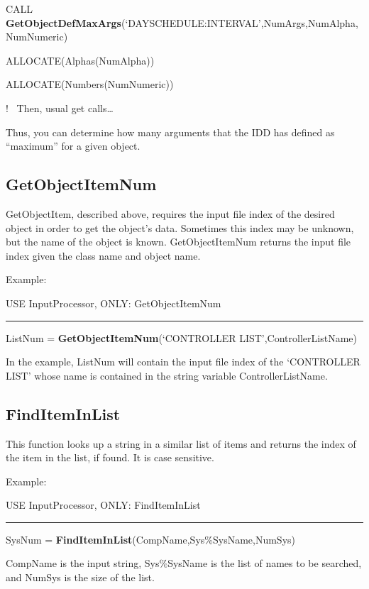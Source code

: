 CALL \textbf{GetObjectDefMaxArgs}(`DAYSCHEDULE:INTERVAL',NumArgs,NumAlpha,NumNumeric)

ALLOCATE(Alphas(NumAlpha))

ALLOCATE(Numbers(NumNumeric))

!~ Then, usual get calls\ldots{}

Thus, you can determine how many arguments that the IDD has defined as ``maximum'' for a given object.

\subsection{GetObjectItemNum}\label{getobjectitemnum}

GetObjectItem, described above, requires the input file index of the desired object in order to get the object's data. Sometimes this index may be unknown, but the name of the object is known. GetObjectItemNum returns the input file index given the class name and object name.

Example:

USE InputProcessor, ONLY: GetObjectItemNum

\begin{center}\rule{0.5\linewidth}{\linethickness}\end{center}

ListNum = \textbf{GetObjectItemNum}(`CONTROLLER LIST',ControllerListName)

In the example, ListNum will contain the input file index of the `CONTROLLER LIST' whose name is contained in the string variable ControllerListName.

\subsection{FindItemInList}\label{finditeminlist}

This function looks up a string in a similar list of items and returns the index of the item in the list, if found. It is case sensitive.

Example:

USE InputProcessor, ONLY: FindItemInList

\begin{center}\rule{0.5\linewidth}{\linethickness}\end{center}

SysNum = \textbf{FindItemInList}(CompName,Sys\%SysName,NumSys)

CompName is the input string, Sys\%SysName is the list of names to be searched, and NumSys is the size of the list.

